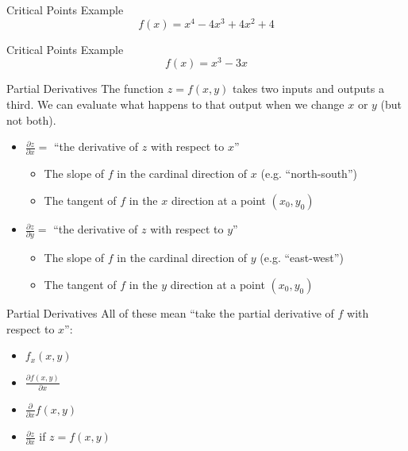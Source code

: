 \documentclass[aspectratio=169]{beamer}
\begin{document}
\begin{frame}{Critical Points Example}\label{main1}
	\vspace{-4cm}
     \[
    f(x) = x^4 - 4x^3 + 4x^2 + 4
    \]
\end{frame}

\begin{frame}{Critical Points Example}\label{main2}
    \vspace{-4cm}
    \[
    f(x) = x^3 - 3x
    \]
\end{frame}

\begin{frame}{Partial Derivatives}\label{main1}
    The function $z = f(x, y)$ takes two inputs and outputs a third.  We can evaluate what happens to that output when we change $x$ or $y$ (but not both).
    \begin{itemize}
        \item $\frac{\partial z}{\partial x} =$ “the derivative of $z$ with respect to $x$”
        \begin{itemize}
        \item The slope of $f$ in the cardinal direction of $x$ (e.g. “north-south”)
        \item The tangent of $f$ in the $x$ direction at a point $(x_0, y_0)$
        \end{itemize}
        \item $\frac{\partial z}{\partial y} =$ “the derivative of $z$ with respect to $y$”
        \begin{itemize}
        \item The slope of $f$ in the cardinal direction of $y$ (e.g. “east-west”)
        \item The tangent of $f$ in the $y$ direction at a point $(x_0, y_0)$
    	\end{itemize}
    \end{itemize}
\end{frame}

\begin{frame}{Partial Derivatives}\label{main1}
    All of these mean “take the partial derivative of $f$ with respect to $x$”:
    \begin{itemize}
        \item $f_x(x, y)$
        \item $\frac{\partial f(x, y)}{\partial x}$
        \item $\frac{\partial}{\partial x} f(x, y)$
        \item $\frac{\partial z}{\partial x}$ if $z = f(x, y)$
    \end{itemize}
\end{frame}
\end{document}
